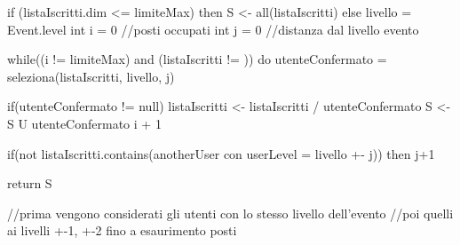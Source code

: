     if (listaIscritti.dim <= limiteMax) then S <- all(listaIscritti)
    else 
        livello = Event.level
        int i = 0  //posti occupati
        int j = 0  //distanza dal livello evento
        
        while((i != limiteMax) and (listaIscritti != {})) do
            utenteConfermato = seleziona(listaIscritti, livello, j)
            
	    if(utenteConfermato != null) {
            	listaIscritti <- listaIscritti / {utenteConfermato}
            	S <- S U {utenteConfermato}
            	i + 1
	    }

            if(not listaIscritti.contains(anotherUser con userLevel = livello +- j)) then j+1
        
    return S

//prima vengono considerati gli utenti con lo stesso livello dell'evento
//poi quelli ai livelli +-1, +-2 fino a esaurimento posti

